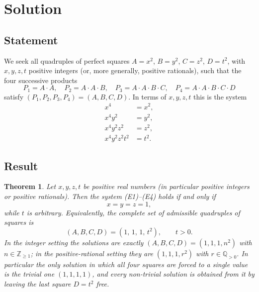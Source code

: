 \documentclass{amsart}
\newtheorem{theorem}{Theorem}
\begin{document}
\section*{Solution}

\subsection*{Statement}
We seek all quadruples of perfect squares $A=x^2$, $B=y^2$, $C=z^2$, $D=t^2$,
with $x,y,z,t$ positive integers (or, more generally, positive rationals),
such that the four successive products
\[
P_1 = A\cdot A,\quad P_2 = A\cdot A\cdot B,\quad P_3 = A\cdot A\cdot B\cdot C,\quad
P_4 = A\cdot A\cdot B\cdot C\cdot D
\]
satisfy $(P_1,P_2,P_3,P_4)=(A,B,C,D)$. In terms of $x,y,z,t$ this is the system
\begin{align}
x^4 &= x^2, \tag{E1}\\
x^4 y^2 &= y^2, \tag{E2}\\
x^4 y^2 z^2 &= z^2, \tag{E3}\\
x^4 y^2 z^2 t^2 &= t^2. \tag{E4}
\end{align}

\subsection*{Result}

\begin{theorem}
Let $x,y,z,t$ be positive real numbers (in particular positive integers or positive
rationals). Then the system \textup{(E1)--(E4)} holds if and only if
\[
x=y=z=1,
\]
while $t$ is \emph{arbitrary}. Equivalently, the complete set of admissible quadruples
of squares is
\[
(A,B,C,D)=(1,\,1,\,1,\,t^2),\qquad t>0 .
\]
In the integer setting the solutions are exactly $(A,B,C,D)=(1,1,1,n^2)$ with
$n\in\mathbb{Z}_{\ge 1}$; in the positive-rational setting they are
$(1,1,1,r^2)$ with $r\in\mathbb{Q}_{>0}$. In particular the only solution in which all
four squares are forced to a single value is the trivial one $(1,1,1,1)$, and every
non-trivial solution is obtained from it by leaving the last square $D=t^2$ free.
\end{theorem}
\end{document}
